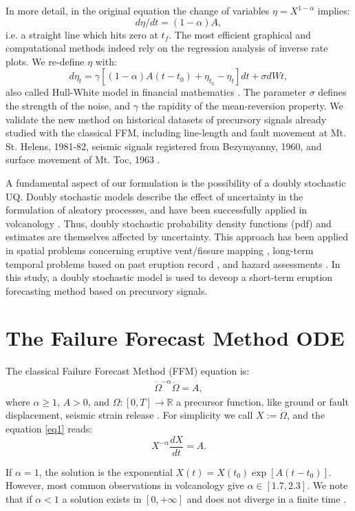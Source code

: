 \documentclass{article}
\begin{document}
In more detail, in the original equation the change of variables $\eta=X^{1-\alpha}$ implies:
$$d\eta/dt=(1-\alpha)A,$$
i.e. a straight line which hits zero at $t_f$. The most efficient graphical and computational methods indeed rely on the regression analysis of inverse rate plots. We re-define $\eta$ with:
$$d\eta_t=\gamma[(1-\alpha)A(t-t_0)+\eta_{t_0}-\eta_t]dt+\sigma dWt,$$
also called Hull-White model in financial mathematics \citep{HullWhite1990}. The parameter $\sigma$ defines the strength of the noise, and $\gamma$ the rapidity of the mean-reversion property. We validate the new method on historical datasets of precursory signals already studied with the classical FFM, including line-length and fault movement at Mt. St. Helens, 1981-82, seismic signals registered from Bezymyanny, 1960, and surface movement of Mt. Toc, 1963 \citep{Voight1988}.

A fundamental aspect of our formulation is the possibility of a doubly stochastic UQ. Doubly stochastic models describe the effect of uncertainty in the formulation of aleatory processes, and have been successfully applied in volcanology \citep{Sparks2004, Marzocchi2012, Bevilacqua2016}. Thus, doubly stochastic probability density functions (pdf) and estimates are themselves affected by uncertainty. This approach has been applied in spatial problems concerning eruptive vent/fissure mapping \citep{Selva2012, Bevilacqua2015, Tadini2017a, Tadini2017b, Bevilacqua2017a}, long-term temporal problems based on past eruption record \citep{Bebbington2013, Bevilacqua2016b, Richardson2017, Bevilacqua2018}, and hazard assessments \citep{Neri2015, Bevilacqua2017b}. In this study, a doubly stochastic model is used to deveop a short-term eruption forecasting method based on precursory signals.

\section{The Failure Forecast Method ODE}
The classical Failure Forecast Method (FFM) equation is:
\begin{align}\label{eq1}
\dot\Omega^{-\alpha}\ddot{\Omega}=A,
\end{align}
where $\alpha\ge 1$, $A>0$, and $\Omega:[0,T]\rightarrow \mathbb R$ a precursor function, like ground or fault displacement, seismic strain release \citep{Voight1988}. For simplicity we call $X:=\dot\Omega$, and the equation \ref{eq1} reads:
$$X^{-\alpha}\frac{dX}{dt}=A.$$

If $\alpha=1$, the solution is the exponential $X(t)=X(t_0)\exp[A(t-t_0)]$. However, most common observations in volcanology give $\alpha\in[1.7,2.3]$. We note that if $\alpha<1$ a solution exists in $[0,+\infty]$ and does not diverge in a finite time \citep{Cornelius1995}.
\end{document}
